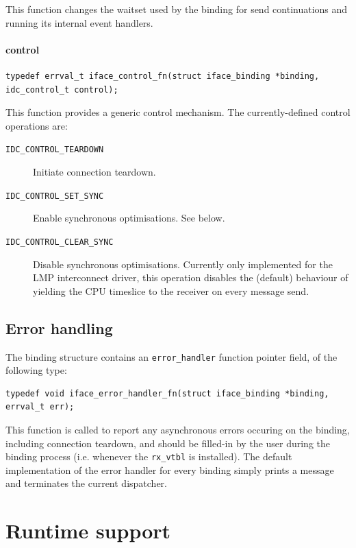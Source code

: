 \documentclass[a4paper,twoside]{report} %
\begin{document}
This function changes the waitset used by the binding for send continuations
and running its internal event handlers.

\subsubsection*{control}

\begin{lstlisting}
typedef errval_t iface_control_fn(struct iface_binding *binding, idc_control_t control);
\end{lstlisting}

This function provides a generic control mechanism. The currently-defined
control operations are:

\begin{description}
 \item[\texttt{IDC\_CONTROL\_TEARDOWN}] Initiate connection teardown.
 \item[\texttt{IDC\_CONTROL\_SET\_SYNC}] Enable synchronous optimisations.
   See below.
 \item[\texttt{IDC\_CONTROL\_CLEAR\_SYNC}] Disable synchronous optimisations.
   Currently only implemented for the LMP interconnect driver, this operation
   disables the (default) behaviour of yielding the CPU timeslice to the
   receiver on every message send.
\end{description}


\section{Error handling}\label{sec:binding_errors}

The binding structure contains an \lstinline+error_handler+ function pointer
field, of the following type:

\begin{lstlisting}
typedef void iface_error_handler_fn(struct iface_binding *binding, errval_t err);
\end{lstlisting}

This function is called to report any asynchronous errors occuring on the
binding, including connection teardown, and should be filled-in by the user
during the binding process (i.e. whenever the \lstinline+rx_vtbl+ is installed).
The default implementation of the error handler for every binding simply
prints a message and terminates the current dispatcher.


\chapter{Runtime support}
\end{document}
